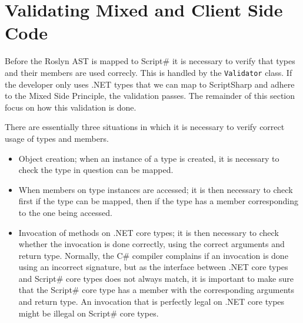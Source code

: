 \section{Validating Mixed and Client Side Code} %
\label{sec:syntax_tree_validation}

	Before the Roslyn AST is mapped to Script\# it is necessary to verify that types and their members are used correcly. This is handled by the \texttt{Validator} class. If the developer only uses .NET types that we can map to ScriptSharp and adhere to the Mixed Side Principle, the validation passes. The remainder of this section focus on how this validation is done.




There are essentially three situations in which it is necessary to verify correct usage of types and members.

\begin{itemize}
	\item Object creation; when an instance of a type is created, it is necessary to check the type in question can be mapped.
	\item When members on type instances are accessed; it is then necessary to check first if the type can be mapped, then if the type has a member corresponding to the one being accessed.
	\item Invocation of methods on .NET core types; it is then necessary to check whether the invocation is done correctly, using the correct arguments and return type. Normally, the C\# compiler complains if an invocation is done using an incorrect signature, but as the interface between .NET core types and Script\# core types does not always match, it is important to make sure that the Script\# core type has a member with the corresponding arguments and return type. An invocation that is perfectly legal on .NET core types might be illegal on Script\# core types.
\end{itemize}

